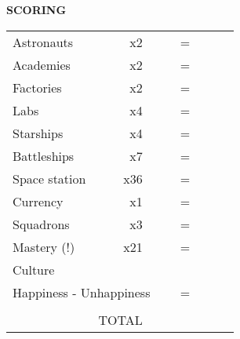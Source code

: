 \begin{flushleft}
  \textbf{SCORING}
\end{flushleft}
\begin{tabular}{lrllrlll}
Astronauts       & x2                   &           &  & =                     &  &                       &  \\ \cline{3-4} \cline{6-7}
Academies       & x2                   &           &  & =                     &  &                       &  \\ \cline{3-4} \cline{6-7}
Factories       & x2                   &           &  & =                     &  &                       &  \\ \cline{3-4} \cline{6-7}
Labs             & x4                   &           &  & =                     &  &                       &  \\ \cline{3-4} \cline{6-7}
Starships   & x4                   &           &  & =                     &  &                       &  \\ \cline{3-4} \cline{6-7}
Battleships    & x7                   &           &  & =                     &  &                       &  \\ \cline{3-4} \cline{6-7}
Space station      & x36                  &           &  & =                     &  &                       &  \\ \cline{3-4} \cline{6-7}
Currency        & x1                   &           &  & =                     &  &                       &  \\ \cline{3-4} \cline{6-7}
Squadrons      & x3                   &           &  & =                     &  &                       &  \\ \cline{3-4} \cline{6-7}
Mastery (!) & x21                  &           &  & =                     &  &                       &  \\ \cline{3-4} \cline{6-7}
Culture     &                      &           &  &                       &  &                       &  \\ \cline{6-7}
\multicolumn{4}{l}{Happiness - Unhappiness}       & =                     &  &                       &  \\ \cline{6-7}
            & \multicolumn{1}{l}{} &           &  & \multicolumn{1}{l}{}  &  &                       &  \\ \cline{6-7}
            & TOTAL                & \textbf{} &  & \multicolumn{1}{r|}{} &  & \multicolumn{1}{l|}{} &  \\ \cline{6-7}
\end{tabular}
